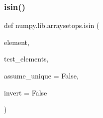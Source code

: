  \mbox{\label{namespacenumpy_1_1lib_1_1arraysetops_af393d30e45d93ce9da6c4ebbe47541ee}} 
\subsubsection{\texorpdfstring{isin()}{isin()}}
{\footnotesize\ttfamily def numpy.\+lib.\+arraysetops.\+isin (\begin{DoxyParamCaption}\item[{}]{element,  }\item[{}]{test\+\_\+elements,  }\item[{}]{assume\+\_\+unique = {\ttfamily False},  }\item[{}]{invert = {\ttfamily False} }\end{DoxyParamCaption})}


